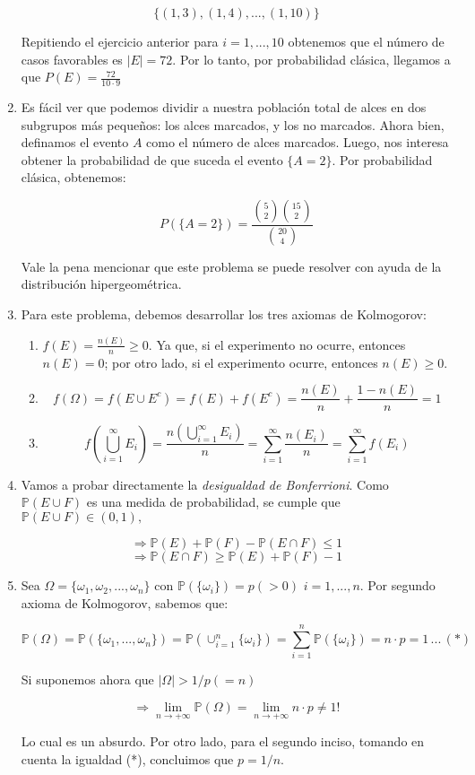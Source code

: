 \documentclass[a4paper]{article}
\begin{document}
\begin{enumerate}
    $$ \{(1,3),(1,4),...,(1,10)\}$$
    
    Repitiendo el ejercicio anterior para $i=1,...,10$ obtenemos que el número de casos favorables es $ | E | = 72.$ Por lo tanto, por probabilidad clásica, llegamos a que $P(E) = \frac{72}{10 \cdot 9}$

    \item Es fácil ver que podemos dividir a nuestra población total de alces en dos subgrupos más pequeños: los alces marcados, y los no marcados. Ahora bien, definamos el evento $A$ como el número de alces marcados. Luego, nos interesa obtener la probabilidad de que suceda el evento $\{A = 2\}$. Por probabilidad clásica, obtenemos:
    
    $$ P(\{A = 2\}) = \frac{\binom{5}{2} \binom{15}{2}}{\binom{20}{4}}$$
    
    Vale la pena mencionar que este problema se puede resolver con ayuda de la distribución hipergeométrica. 
    
    \item Para este problema, debemos desarrollar los tres axiomas de Kolmogorov:
    
    \begin{enumerate}
        \item $f(E)= \frac{n(E)}{n} \ge 0$. Ya que, si el experimento no ocurre, entonces $n(E)=0$; por otro lado, si el experimento ocurre, entonces $n(E) \ge 0.$
        \item \[ f(\Omega) = f(E \cup E^c) = f(E) + f(E^c) = \frac{n(E)}{n} + \frac{1-n(E)}{n} = 1 \]
        \item \[ f(\bigcup_{i=1}^\infty E_i) = \frac{n(\bigcup_{i=1}^\infty E_i)}{n} = \sum_{i=1}^\infty \frac{n(E_i)}{n} = \sum_{i=1}^\infty f(E_i) \]
    \end{enumerate}
    
    \item Vamos a probar directamente la \textit{desigualdad de Bonferrioni}. Como $\mathbb{P}(E \cup F)$ es una medida de probabilidad, se cumple que $\mathbb{P}(E \cup F) \in (0,1),$
    
    \[ \Rightarrow \mathbb{P}(E) + \mathbb{P}(F) - \mathbb{P}(E \cap F) \le 1\]
    \[ \Rightarrow \mathbb{P}(E \cap F) \ge \mathbb{P}(E) + \mathbb{P}(F) -1 \]
    
    \item Sea $\Omega = \{ \omega_1, \omega_2, ..., \omega_n\}$ con $\mathbb{P}(\{\omega_i\}) = p (>0)$ $i = 1,...,n.$ Por segundo axioma de Kolmogorov, sabemos que:
    
    \[ \mathbb{P}(\Omega) = \mathbb{P}(\{\omega_1,...,\omega_n \}) = \mathbb{P}(\cup_{i = 1}^n \{\omega_i\}) = \sum_{i=1}^n \mathbb{P}(\{ \omega_i\}) = n \cdot p = 1\,... \,(*)\]
    
    Si suponemos ahora que $|\Omega| > 1/p (= n)$
    
    \[\Rightarrow \lim_{n \to +\infty} \mathbb{P}(\Omega) = \lim_{n \to +\infty} n \cdot p \neq 1 !\]
    
    Lo cual es un absurdo. Por otro lado, para el segundo inciso, tomando en cuenta la igualdad (*), concluimos que $p = 1/n.$
    
    
    
\end{enumerate}
\end{document}
